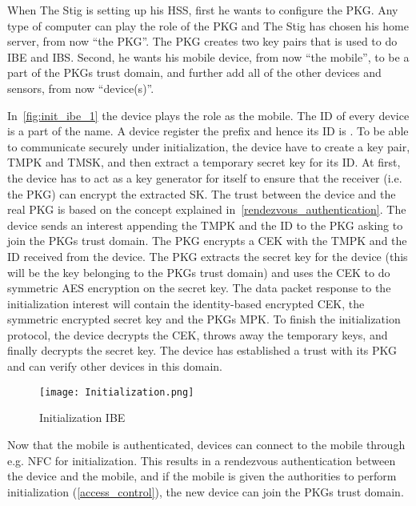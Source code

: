 When The Stig is setting up his \gls{HSS}, first he wants to configure the \gls{PKG}. 
Any type of computer can play the role of the \gls{PKG} and The Stig has chosen his home server, from now ``the PKG''.
The \gls{PKG} creates two key pairs that is used to do \gls{IBE} and \gls{IBS}.
Second, he wants his mobile device, from now ``the mobile'', to be a part of the \gls{PKG}s trust domain, and further add all of the other devices and sensors, from now ``device(s)''.

In~\autoref{fig:init_ibe_1} the device plays the role as the mobile. 
The \gls{ID} of every device is a part of the \gls{name}.
A device register the prefix  and hence its \gls{ID} is .
To be able to communicate securely under initialization, the device have to create a key pair, \gls{TMPK} and \gls{TMSK}, and then extract a temporary secret key for its \gls{ID}. 
At first, the device has to act as a key generator for itself to ensure that the \gls{receiver} (i.e. the \gls{PKG}) can encrypt the extracted \gls{SK}.
The trust between the device and the real \gls{PKG} is based on the concept explained in~\autoref{rendezvous_authentication}.
The device sends an \gls{interest} appending the \gls{TMPK} and the \gls{ID} to the \gls{PKG} asking to join the \gls{PKG}s trust domain.
The \gls{PKG} encrypts a \gls{CEK} with the \gls{TMPK} and the \gls{ID} received from the device. 
The \gls{PKG} extracts the secret key for the device (this will be the key belonging to the \gls{PKG}s trust domain) and uses the \gls{CEK} to do symmetric \gls{AES} encryption on the secret key. 
The \gls{data} packet response to the initialization \gls{interest} will contain the identity-based encrypted \gls{CEK}, the symmetric encrypted secret key and the \gls{PKG}s \gls{MPK}.
To finish the initialization protocol, the device decrypts the \gls{CEK}, throws away the temporary keys, and finally decrypts the secret key.
The device has established a trust with its \gls{PKG} and can verify other devices in this domain. 

\begin{figure}[ht]
  \centering
  \texttt{[image: Initialization.png]}
  \caption{Initialization IBE}
  \label{fig:init_ibe_1}
\end{figure}

Now that the mobile is authenticated, devices can connect to the mobile through e.g. \gls{NFC} for initialization.
This results in a rendezvous authentication between the device and the mobile, and if the mobile is given the authorities to perform initialization (\autoref{access_control}), the new device can join the \gls{PKG}s trust domain.

